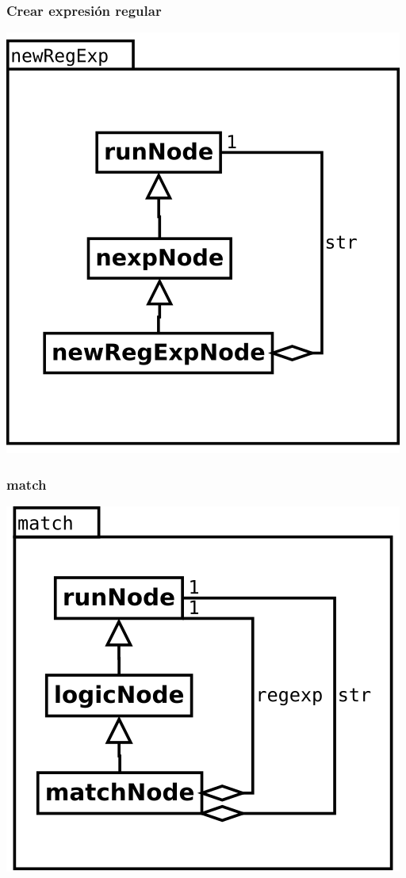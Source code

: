 \subsubsection {Crear expresión regular}
\begin{center}
\includegraphics[scale=0.4]{newRegExp.png} \\
\end{center}

\subsubsection {match}
\begin{center}
\includegraphics[scale=0.4]{match.png} \\
\end{center}

